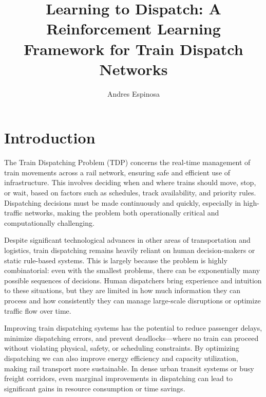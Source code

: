 \documentclass[runningheads]{llncs}
\begin{document}
\title{Learning to Dispatch: A Reinforcement Learning Framework for Train Dispatch Networks}
\titlerunning{\textcolor{uf_blue}{Learning to Dispatch}}

\author{\textcolor{uf_blue}{Andres Espinosa}}
\maketitle


\begin{abstract}

\end{abstract}



\section{Introduction}
\label{sse:introduction}

The Train Dispatching Problem (TDP) concerns the real-time management of train movements across a rail network, ensuring safe and efficient use of infrastructure. 
This involves deciding when and where trains should move, stop, or wait, based on factors such as schedules, track availability, and priority rules. 
Dispatching decisions must be made continuously and quickly, especially in high-traffic networks, making the problem both operationally critical and computationally challenging.

Despite significant technological advances in other areas of transportation and logistics, train dispatching remains heavily reliant on human decision-makers or static rule-based systems. 
This is largely because the problem is highly combinatorial: even with the smallest problems, there can be exponentially many possible sequences of decisions. 
Human dispatchers bring experience and intuition to these situations, but they are limited in how much information they can process and how consistently they can manage large-scale disruptions or optimize traffic flow over time.

Improving train dispatching systems has the potential to reduce passenger delays, minimize dispatching errors, and prevent deadlocks—where no train can proceed without violating physical, safety, or scheduling constraints. 
By optimizing dispatching we can also improve energy efficiency and capacity utilization, making rail transport more sustainable. 
In dense urban transit systems or busy freight corridors, even marginal improvements in dispatching can lead to significant gains in resource consumption or time savings.
\end{document}
